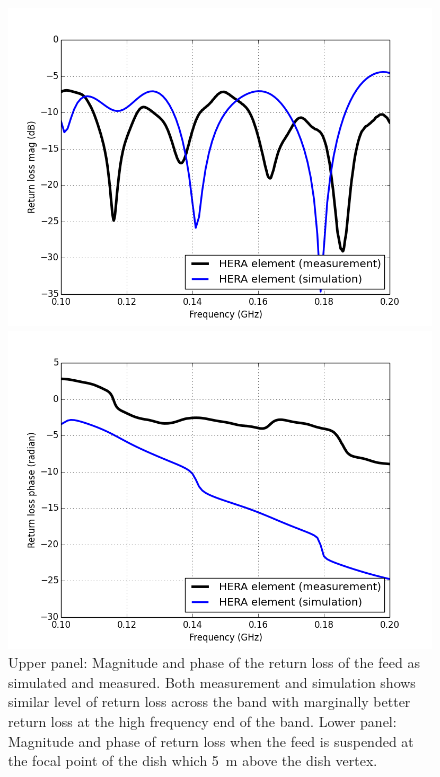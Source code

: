 \documentclass[twocolumn]{emulateapj}
\begin{document}
\begin{figure}[ht]
\begin{minipage}[b]{0.5\linewidth}
    \centering
    \includegraphics[angle=0, width=\linewidth]{GB_reflectometry_part3/plot/RL_HERA_mag.png}
    \end{minipage}
    \hspace{0.1cm}
    \begin{minipage}[b]{0.5\linewidth}
    \centering
    \includegraphics[angle=0, width=\linewidth]{GB_reflectometry_part3/plot/RL_HERA_ph.png}
    \end{minipage}
    \caption{Upper panel: Magnitude and phase of the return loss of the feed as simulated and measured. Both measurement and simulation shows similar level of return loss across the band with marginally better return loss at the high frequency end of the band. Lower panel: Magnitude and phase of return loss when the feed is suspended at the focal point of the dish which 5~m above the dish vertex.}   
    \label{RL_mag_dish}
    \end{figure}
    
\end{document}
